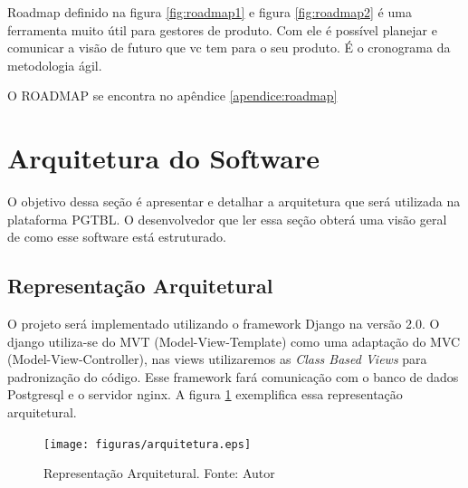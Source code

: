 Roadmap definido na figura \ref{fig:roadmap1} e figura \ref{fig:roadmap2} é uma ferramenta muito útil para gestores de produto. Com ele é possível planejar e comunicar a visão de futuro que vc tem para o seu produto. É o cronograma da metodologia ágil.

O ROADMAP se encontra no apêndice \ref{apendice:roadmap}

\section{Arquitetura do Software}

O objetivo dessa seção é apresentar e detalhar a arquitetura que será utilizada na plataforma PGTBL. O desenvolvedor que
ler essa seção obterá uma visão geral de como esse software está estruturado.

\subsection{Representação Arquitetural}

O projeto será implementado utilizando o framework Django na versão 2.0. O django utiliza-se do MVT (Model-View-Template) como uma adaptação do MVC (Model-View-Controller), nas views utilizaremos as \textit{Class Based Views} para padronização do código. Esse framework fará comunicação com o banco de dados Postgresql e o servidor nginx.  A figura \ref{fig:arquitetura} exemplifica essa representação arquitetural.

\begin{figure}[h!]
	\centering
  \texttt{[image: figuras/arquitetura.eps]}
  \caption[Representação Arquitetural.]{Representação Arquitetural. Fonte: Autor}
	\label{fig:arquitetura}
\end{figure}

